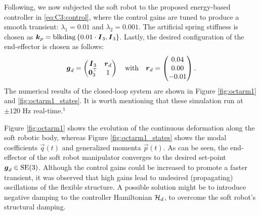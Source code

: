 \begin{example}
Following, we now subjected the soft robot to the proposed energy-based controller in \eqref{eq:C3:control}, where the control gains are tuned to produce a smooth transient: $\lambda_1 = 0.01$ and $\lambda_2 = 0.001$. The artificial spring stiffness is chosen as $\boldsymbol{k}_p = \textnormal{blkdiag}\left\{ {0.01\cdot \boldsymbol{I}_3, \boldsymbol{I}_3} \right\}$. Lastly, the desired configuration of the end-effector is chosen as follows:
%
\begin{equation*}
\boldsymbol{g}_d = \begin{pmatrix} \boldsymbol{I}_3 & \boldsymbol{r}_d \\ \boldsymbol{0}_3^\top & 1 \end{pmatrix} \quad \text{with} \quad \boldsymbol{r}_d = \begin{pmatrix}  0.04 \\ 0.00 \\ -0.01  \end{pmatrix}.
\end{equation*}
%
The numerical results of the closed-loop system are shown in Figure \ref{fig:octarm1} and \ref{fig:octarm1_states}. It is worth mentioning that these simulation run at $\pm120$ \si{\hertz} real-time.$^{1}$  

Figure \ref{fig:octarm1} shows the evolution of the continuous deformation along the soft robotic body, whereas Figure \ref{fig:octarm1_states} shows the modal coefficients $\vec{q}(t)$ and generalized momenta $\vec{p}(t)$. As can be seen, the end-effector of the soft robot manipulator converges to the desired set-point $\boldsymbol{g}_d \in \textup{\textrm{SE}}(3)$. Although the control gains could be increased to promote a faster transient, it was observed that high gains lead to undesired (propagating) oscillations of the flexible structure. A possible solution might be to introduce negative damping to the controller Hamiltonian $\mathcal{H}_d$, to overcome the soft robot's structural damping.


\end{example}
